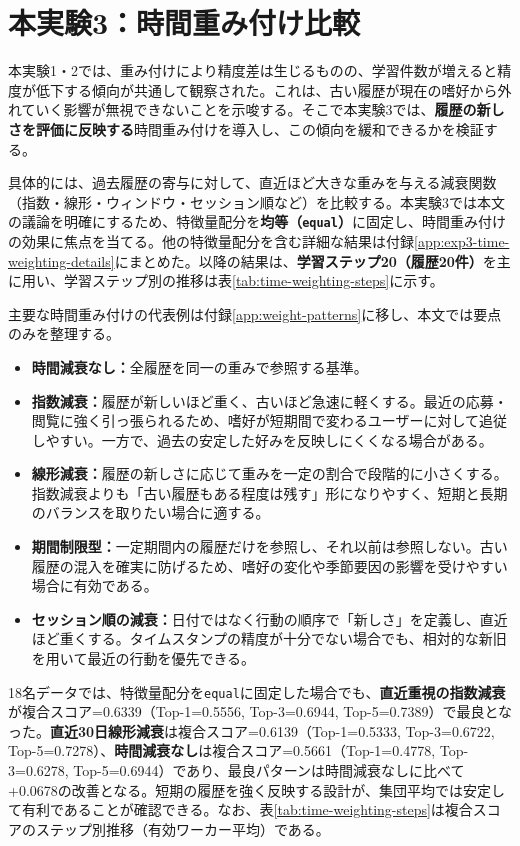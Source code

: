 \section{本実験3：時間重み付け比較}
本実験1・2では、重み付けにより精度差は生じるものの、学習件数が増えると精度が低下する傾向が共通して観察された。これは、古い履歴が現在の嗜好から外れていく影響が無視できないことを示唆する。そこで本実験3では、\textbf{履歴の新しさを評価に反映する}時間重み付けを導入し、この傾向を緩和できるかを検証する。

具体的には、過去履歴の寄与に対して、直近ほど大きな重みを与える減衰関数（指数・線形・ウィンドウ・セッション順など）を比較する。本実験3では本文の議論を明確にするため、特徴量配分を\textbf{均等（\texttt{equal}）}に固定し、時間重み付けの効果に焦点を当てる。他の特徴量配分を含む詳細な結果は付録\ref{app:exp3-time-weighting-details}にまとめた。以降の結果は、\textbf{学習ステップ20（履歴20件）}を主に用い、学習ステップ別の推移は表\ref{tab:time-weighting-steps}に示す。

主要な時間重み付けの代表例は付録\ref{app:weight-patterns}に移し、本文では要点のみを整理する。
\begin{itemize}
	\item \textbf{時間減衰なし：}全履歴を同一の重みで参照する基準。
	\item \textbf{指数減衰：}履歴が新しいほど重く、古いほど急速に軽くする。最近の応募・閲覧に強く引っ張られるため、嗜好が短期間で変わるユーザーに対して追従しやすい。一方で、過去の安定した好みを反映しにくくなる場合がある。
	\item \textbf{線形減衰：}履歴の新しさに応じて重みを一定の割合で段階的に小さくする。指数減衰よりも「古い履歴もある程度は残す」形になりやすく、短期と長期のバランスを取りたい場合に適する。
	\item \textbf{期間制限型：}一定期間内の履歴だけを参照し、それ以前は参照しない。古い履歴の混入を確実に防げるため、嗜好の変化や季節要因の影響を受けやすい場合に有効である。
	\item \textbf{セッション順の減衰：}日付ではなく行動の順序で「新しさ」を定義し、直近ほど重くする。タイムスタンプの精度が十分でない場合でも、相対的な新旧を用いて最近の行動を優先できる。
\end{itemize}

18名データでは、特徴量配分を\texttt{equal}に固定した場合でも、\textbf{直近重視の指数減衰}が複合スコア=0.6339（Top-1=0.5556, Top-3=0.6944, Top-5=0.7389）で最良となった。\textbf{直近30日線形減衰}は複合スコア=0.6139（Top-1=0.5333, Top-3=0.6722, Top-5=0.7278）、\textbf{時間減衰なし}は複合スコア=0.5661（Top-1=0.4778, Top-3=0.6278, Top-5=0.6944）であり、最良パターンは時間減衰なしに比べて+0.0678の改善となる。短期の履歴を強く反映する設計が、集団平均では安定して有利であることが確認できる。なお、表\ref{tab:time-weighting-steps}は複合スコアのステップ別推移（有効ワーカー平均）である。

